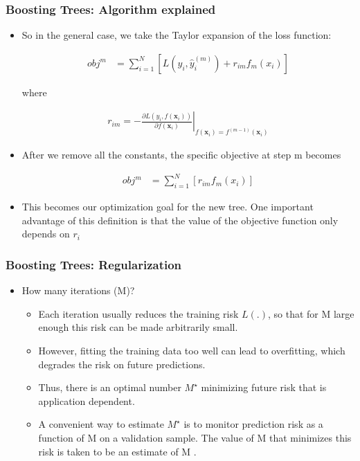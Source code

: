 \documentclass[
  shownotes,
  xcolor={svgnames},
  hyperref={colorlinks,citecolor=DarkBlue,linkcolor=DarkRed,urlcolor=DarkBlue}
  , aspectratio=169]{beamer}
\begin{document}
\begin{frame}[fragile]
\frametitle{Boosting Trees: Algorithm explained}

\begin{itemize}
\item  So in the general case, we take the Taylor expansion of the loss function:

\begin{align}
obj^m &= \sum_{i=1}^N \left[ L(y_i,\hat{y}_i^{(m)}) + r_{im} f_m(x_i) \right]
\end{align}

where 

\begin{align}
        r_{im}=-\left.\frac{\partial L(y_i,f(\mathbf{x}_i))}{\partial f(\mathbf{x}_i)}\right\vert_{f(\mathbf{x}_i)=f^{(m-1)}(\mathbf{x}_i)}
  \end{align}

\item After we remove all the constants, the specific objective at step m becomes


\begin{align}
obj^m &= \sum_{i=1}^N \left[ r_{im} f_m(x_i) \right]
\end{align}

\item This becomes our optimization goal for the new tree. One important advantage of this definition is that the value of the objective function only depends on $r_i$ 
\end{itemize}
 \end{frame}
\begin{frame}[fragile]
\frametitle{Boosting Trees: Regularization}

\begin{itemize}

\item How many iterations (M)?
\begin{itemize}
\medskip

\item Each iteration usually reduces the training risk $L(.)$, so that for M large enough this risk
can be made arbitrarily small.
\medskip
\item  However, fitting the training data too well can lead to overfitting, which degrades the risk on future predictions. 
\medskip
\item Thus, there is an optimal number $M^\star$ minimizing future risk that is application dependent. 
\medskip
\item A convenient way to estimate $M^\star$ is to monitor prediction risk as a function of M on a validation sample. The value of M that minimizes  this risk is taken to be an estimate of M . 
\end{itemize}
\end{itemize}
\end{frame}
\end{document}
